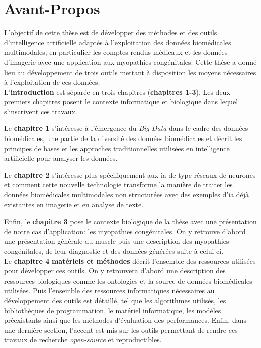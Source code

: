 \chapter{Avant-Propos}
L'objectif de cette thèse est de développer des méthodes et des outils d'intelligence artificielle adaptés à l'exploitation des données biomédicales multimodales, en particulier les comptes rendus médicaux et les données d'imagerie avec une application aux myopathies congénitales. Cette thèse a donné lieu au développement de trois outils mettant à disposition les moyens nécessaires à l'exploitation de ces données. \\


L'\textbf{introduction} est séparée en trois chapitres (\textbf{chapitres 1-3}). Les deux premiers chapitres posent le contexte informatique et biologique dans lequel s'inscrivent ces travaux. 

Le \textbf{chapitre 1} s'intéresse à l'émergence du \textit{Big-Data} dans le cadre des données biomédicales, une partie de la diversité des données biomédicales et décrit les principes de bases et les approches traditionnelles utilisées en intelligence artificielle pour analyser les données.

Le \textbf{chapitre 2} s'intéresse plus spécifiquement aux \gls{ia} de type réseaux de neurones et comment cette nouvelle technologie transforme la manière de traiter les données biomédicales multimodales non structurées avec des exemples d'\gls{ia} déjà existantes en imagerie et en analyse de texte.

Enfin, le \textbf{chapitre 3} pose le contexte biologique de la thèse avec une présentation de notre cas d'application: les myopathies congénitales. On y retrouve d'abord une présentation générale du muscle puis une description des myopathies congénitales, de leur diagnostic et des données générées suite à celui-ci. \\


Le \textbf{chapitre 4} \textbf{matériels et méthodes} décrit l'ensemble des ressources utilisées pour développer ces outils. On y retrouvera d'abord une description des ressources biologiques comme les ontologies et la source de données biomédicales utilisées. Puis l'ensemble des ressources informatiques nécessaires au développement des outils est détaillé, tel que les algorithmes utilisés, les bibliothèques de programmation, le matériel informatique, les modèles préexistants ainsi que les méthodes d'évaluation des performances. Enfin, dans une dernière section, l'accent est mis sur les outils permettant de rendre ces travaux de recherche \textit{open-source} et reproductibles. \\


